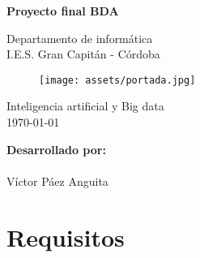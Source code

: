 \documentclass[12pt]{article}
\begin{document}
\begin{titlepage}
    \begin{center}
      \Large \bfseries{}
    \end{center}
    \vspace{0.1cm}
    \begin{center}
      \Large \bfseries{}
    \end{center}
    \vspace{0.1cm}
    \begin{center}
     \Large \bfseries{Proyecto final BDA}
    \end{center}
    \vspace{0.0001cm}
    \begin{center}
        Departamento de informática \\ I.E.S. Gran Capitán - Córdoba
    \end{center}
        \vspace{2 cm}
\begin{figure}[h!]
    \centering
    \texttt{[image: assets/portada.jpg]}
    \label{fig:my_label}
\end{figure}
    \vspace{0.2 cm}
    \begin{center}
        Inteligencia artificial y Big data \\ \today 
    \end{center}
    \vspace{4 cm}
\null\hfill \textbf{Desarrollado por:}
\\
\\
\null\hfill Víctor Páez Anguita
\clearpage
\end{titlepage}

\tableofcontents
\clearpage


\section{Requisitos}
\end{document}
